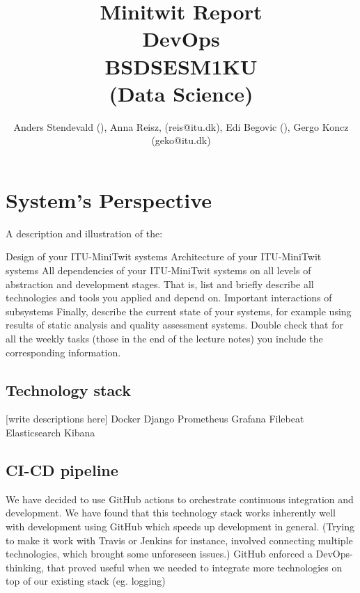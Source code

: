 \documentclass[12pt]{article}
\begin{document}
 
 
\title{Minitwit Report \\
DevOps \\
BSDSESM1KU \\
(Data Science)}

\author{Anders Stendevald (), Anna Reisz, (reis@itu.dk), Edi Begovic (), Gergo Koncz (geko@itu.dk)\\
}

\maketitle
\clearpage

\section{System's Perspective}



A description and illustration of the:

Design of your ITU-MiniTwit systems
Architecture of your ITU-MiniTwit systems
All dependencies of your ITU-MiniTwit systems on all levels of abstraction and development stages.
That is, list and briefly describe all technologies and tools you applied and depend on.
Important interactions of subsystems
Finally, describe the current state of your systems, for example using results of static analysis and quality assessment systems.
Double check that for all the weekly tasks (those in the end of the lecture notes) you include the corresponding information.

\subsection{Technology stack}
[write descriptions here]
Docker
Django
Prometheus
Grafana
Filebeat
Elasticsearch
Kibana


\subsection{CI-CD pipeline}
We have decided to use GitHub actions to orchestrate continuous integration and development. We have found that this technology stack works inherently well with development using GitHub which speeds up development in general. (Trying to make it work with Travis or Jenkins for instance, involved connecting multiple technologies, which brought some unforeseen issues.) GitHub enforced a DevOps-thinking, that proved useful when we needed to integrate more technologies on top of our existing stack (eg. logging)
\end{document}
